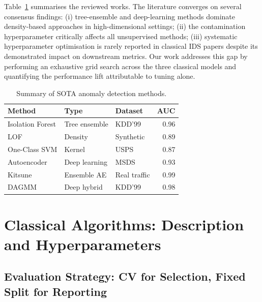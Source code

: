 Table~\ref{tab:sota} summarises the reviewed works. The literature converges on several consensus findings: (i) tree-ensemble and deep-learning methods dominate density-based approaches in high-dimensional settings; (ii) the contamination hyperparameter critically affects all unsupervised methods; (iii) systematic hyperparameter optimisation is rarely reported in classical IDS papers despite its demonstrated impact on downstream metrics. Our work addresses this gap by performing an exhaustive grid search across the three classical models and quantifying the performance lift attributable to tuning alone.

\begin{table}[ht]
  \centering
  \caption{Summary of SOTA anomaly detection methods.}
  \label{tab:sota}
  \footnotesize
  \begin{tabular}{lllr}
    \toprule
    \textbf{Method}      & \textbf{Type}       & \textbf{Dataset}    & \textbf{AUC} \\
    \midrule
    Isolation Forest \cite{liu2008isolation}    & Tree ensemble & KDD'99        & 0.96 \\
    LOF \cite{breunig2000lof}                   & Density       & Synthetic     & 0.89 \\
    One-Class SVM \cite{scholkopf2001ocsvm}     & Kernel        & USPS          & 0.87 \\
    Autoencoder \cite{sakurada2014autoencoder}  & Deep learning & MSDS          & 0.93 \\
    Kitsune \cite{mirsky2018kitsune}            & Ensemble AE   & Real traffic  & 0.99 \\
    DAGMM \cite{zong2018dagmm}                  & Deep hybrid   & KDD'99        & 0.98 \\
    \bottomrule
  \end{tabular}
\end{table}

\section{Classical Algorithms: Description and Hyperparameters}

\subsection{Evaluation Strategy: CV for Selection, Fixed Split for Reporting}

